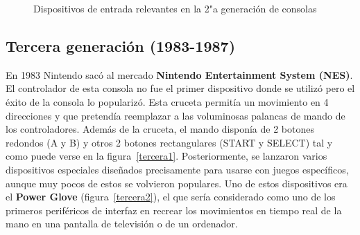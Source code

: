 \begin{figure}[t]
     \hfill
\hfill
     \caption{Dispositivos de entrada relevantes en la 2"a  generaci\'on de consolas}
     \label{fig:segunda}
   \end{figure}

\subsection{Tercera generaci\'on (1983-1987)}


En 1983 Nintendo sac\'o al mercado \textbf{Nintendo Entertainment System (NES)}. El controlador de esta consola no fue el primer dispositivo donde se utiliz\'o pero el \'exito de la consola lo populariz\'o. Esta cruceta permit\'ia un movimiento en 4 direcciones y que pretend\'ia reemplazar a las voluminosas palancas de mando de los controladores. Adem\'as de la cruceta, el mando dispon\'ia de 2 botones redondos (A y B) y otros 2 botones rectangulares (START y SELECT) tal y como puede verse en la figura~\ref{tercera1}. Posteriormente, se lanzaron varios dispositivos especiales dise\~nados precisamente para usarse con juegos espec\'ificos, aunque muy pocos de estos se volvieron populares. Uno de estos dispositivos era el \textbf{Power Glove} (figura~\ref{tercera2}), el que ser\'ia considerado como uno de los primeros perif\'ericos de interfaz en recrear los movimientos en tiempo real de la mano en una pantalla de televisi\'on o de un ordenador. \\

